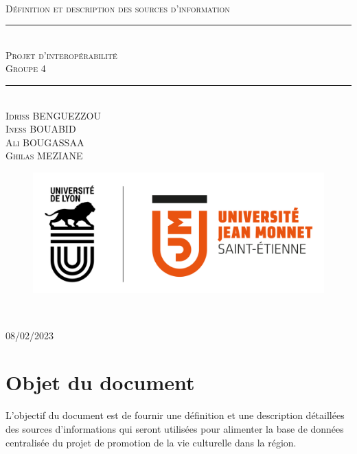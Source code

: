 \documentclass[a4paper, 12pt]{article}
\newcommand{\HRule}{\rule{\linewidth}{0.5mm}}
\begin{document}
\begin{titlepage}
  \begin{sffamily}
  \begin{center}

   
  \textsc{\LARGE }\\[2cm]

    \textsc{\Large Définition et description des sources d’information}

    \HRule \\[0.4cm]
    { \huge  \textsc{Projet d'interopérabilité} \\
    \textsc{\small Groupe 4}\\ [0.4cm] }
	

    \HRule \\[2cm]
    \textsc {Idriss BENGUEZZOU\\ Iness BOUABID\\Ali BOUGASSAA\\Ghilas MEZIANE }
 \begin{figure}
     \centering
    \includegraphics[scale=0.2]{logoUJM.png}
     \label{fig:ujm_logo}
 \end{figure}
   
    \

    \vfill

    {\large {} 08/02/2023}

  \end{center}
  \end{sffamily}
\end{titlepage}


\newpage
\tableofcontents

\newpage
\section{Objet du document}

L'objectif du document est de fournir une définition et une description détaillées des sources d'informations qui seront utilisées pour alimenter la base de données centralisée du projet de promotion de la vie culturelle dans la région.
\end{document}
